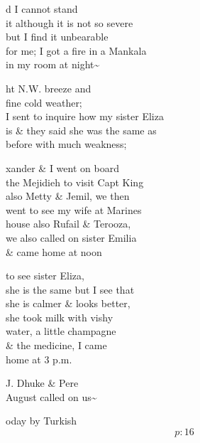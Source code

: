\documentclass{report}
\begin{document}
	\par{
 	d I cannot stand\ \\it although it is not so severe\ \\but I find it unbearable\ \\for me; I got a fire in a Mankala\ \\in my room at night\~{}\ \\
	}


	\par{
 	ht N.W. breeze and\ \\fine cold weather;\ \\I sent to inquire how my sister Eliza\ \\is \& they said she was the same as\ \\before with much weakness;\ \\
	}

	\par{
 	xander \& I went on board\ \\the Mejidieh to visit Capt King\ \\also Metty \& Jemil, we then\ \\went to see my wife at Marines\ \\house also Rufail \& Terooza,\ \\we also called on sister Emilia\ \\\& came home at noon\ \\
	}

	\par{
 	to see sister Eliza,\ \\she is the same but I see that\ \\she is calmer \& looks better,\ \\she took milk with vishy\ \\water, a little champagne\ \\\& the medicine, I came\ \\home at 3 p.m.\ \\
	}

	\par{
 	J. Dhuke \& Pere\ \\August called on us\~{}\ \\
	}

	\par{
 	oday by Turkish\ \\
  \[p: 16 \]

	}

\end{document}
